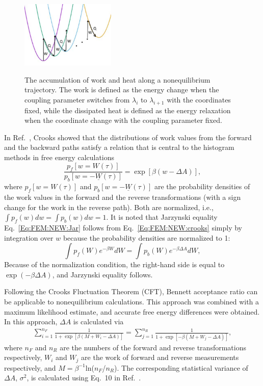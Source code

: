 \begin{figure}[htbp]
	\centering
	\includegraphics[width=0.4\textwidth]{figures/NEW.pdf}\\
	\caption{The accumulation of work and heat along a nonequilibrium trajectory. The work is defined as the energy change when the coupling parameter switches from $\lambda_i$ to $\lambda_{i+1}$ with the coordinates fixed, while the dissipated heat is defined as the energy relaxation when the coordinate change with the coupling parameter fixed.}\label{Fig:FEM:NEW}
\end{figure}

In Ref.~\cite{CrooksJSP1998}, Crooks showed that the distributions of work values from the forward and the backward paths satisfy a relation that is central to the histogram methods in free energy calculations
\begin{equation}
\frac{p_{f}[w=W(\tau)]}{p_{b}[w=-\underline{W}(\tau)]}=\exp[\beta(w-\Delta A)],
\label{Eq:FEM:NEW:crooks}
\end{equation}
where $p_{f}[w=W(\tau)]$ and $p_{b}[w=-\underline{W}(\tau)]$ are the probability densities of the work values in the forward and the reverse transformations (with a sign change for the work in the reverse path). Both are normalized, i.e., $\int p_{f}(w) dw=\int p_{b}(w) dw=1$. It is noted that Jarzynski equality Eq.~\ref{Eq:FEM:NEW:Jar} follows from Eq.~\ref{Eq:FEM:NEW:crooks} simply by integration over $w$ because the probability densities are normalized to 1:
\begin{equation}
\int p_{f}(W)e^{-\beta W}dW=\int p_{b}(W)e^{-\beta \Delta A}dW,
\label{Eq:FEM:NEW:crookstojar}
\end{equation}
Because of the normalization condition, the right-hand side is equal to $\exp(-\beta \Delta A)$, and Jarzynski equality follows.

Following the Crooks Fluctuation Theorem (CFT),\cite{CrooksJSP1998} Bennett acceptance ratio can be applicable to nonequilibrium calculations. This approach was combined with a maximum likelihood estimate, and accurate free energy differences were obtained.\cite{ShirtsPRL2003}
In this approach, $\Delta A$ is calculated via
\begin{align}
\sum_{i=1}^{n_{F}}\frac{1}{1+\exp \left[\beta(M+W_{i}-\Delta A)\right]} = \sum_{j=1}^{n_{R}}\frac{1}{1+\exp \left[-\beta(M+W_{j}-\Delta A)\right]},
\label{Eq:FEM:NEW:NEBAR}
\end{align}
where $n_{F}$ and $n_{R}$ are the numbers of the forward and reverse transformations respectively, $W_{i}$ and $W_{j}$ are the work of forward and reverse measurements respectively, and $M=\beta^{-1}$ln($n_{F}$/$n_{R}$).
The corresponding statistical variance of $ \Delta A $, $ \sigma^2 $, is calculated using Eq.~10 in Ref.~\cite{ShirtsPRL2003}.